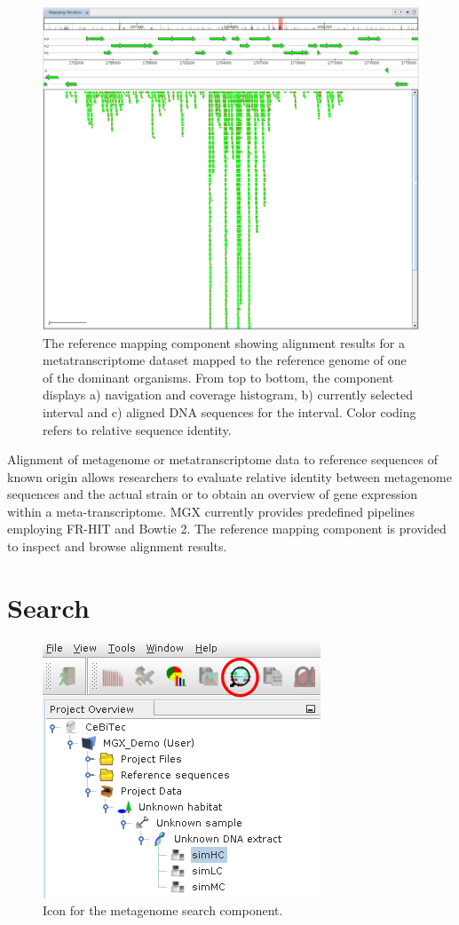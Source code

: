 \begin{figure}[H]
\centering
\includegraphics[width=\textwidth]{img/mgx/RefMapping}
\caption[Reference mapping]{The reference mapping component showing alignment results for a metatranscriptome dataset mapped to the reference genome of one of the dominant organisms. From top to bottom, the component displays a) navigation and coverage histogram, b) currently selected interval and c) aligned DNA sequences for the interval. Color coding refers to relative sequence identity.}
\label{refmap}
\end{figure}

Alignment of metagenome or metatranscriptome data to reference sequences of known origin allows researchers to evaluate
relative identity between metagenome sequences and the actual strain or to obtain an overview of gene expression within
a meta-transcriptome. MGX currently provides predefined pipelines employing FR-HIT\cite{FRHIT} and Bowtie 2\cite{BOWTIE}. The reference mapping 
component is provided to inspect and browse alignment results.

\section{Search}

\begin{figure}[H]
\centering
\includegraphics[width=.5\textwidth]{img/mgx/SearchOpen}
\caption[Metagenome search]{Icon for the metagenome search component.}
\label{search1}
\end{figure}

